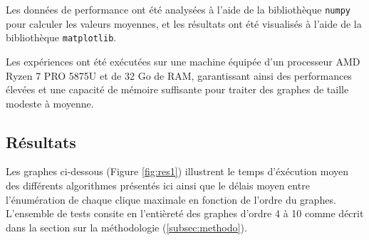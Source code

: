 \documentclass[12pt,a4paper]{article}
\begin{document}
Les données de performance ont été analysées à l'aide de la bibliothèque \texttt{numpy} pour calculer les valeurs moyennes, et les résultats ont été visualisés à l'aide de la bibliothèque \texttt{matplotlib}.

Les expériences ont été exécutées sur une machine équipée d'un processeur AMD Ryzen 7 PRO 5875U et de 32 Go de RAM, garantissant ainsi des performances élevées et une capacité de mémoire suffisante pour traiter des graphes de taille modeste à moyenne.

\subsection{Résultats}%
\label{subsec:res}

Les graphes ci-dessous (Figure \ref{fig:res1}) illustrent le temps d'éxécution moyen des différents algorithmes présentés ici ainsi que le délais moyen entre l'énumération de chaque clique maximale en fonction de l'ordre du graphes. L'ensemble de tests consite en l'entièreté des graphes d'ordre 4 à 10 comme décrit dans la section sur la méthodologie (\ref{subsec:methodo}).
\end{document}
